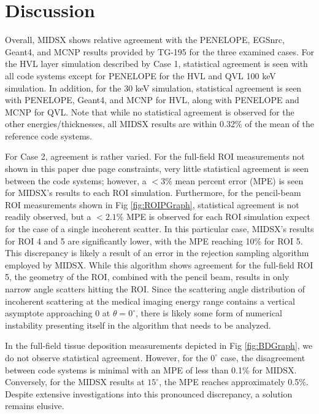 \newpage
\section{Discussion}
\par Overall, MIDSX shows relative agreement with the PENELOPE, EGSnrc, Geant4, and MCNP results provided by TG-195 for the three examined cases. For the HVL layer simulation described by Case 1, statistical agreement is seen with all code systems except for PENELOPE for the HVL and QVL 100 keV simulation. In addition, for the 30 keV simulation, statistical agreement is seen with PENELOPE, Geant4, and MCNP for HVL, along with PENELOPE and MCNP for QVL. Note that while no statistical agreement is observed for the other energies/thicknesses, all MIDSX results are within 0.32\% of the mean of the reference code systems.

\par For Case 2, agreement is rather varied. For the full-field ROI measurements not shown in this paper due page constraints, very little statistical agreement is seen between the code systems; however, a $<3$\% mean percent error (MPE) is seen for MIDSX's results to each ROI simulation. Furthermore, for the pencil-beam ROI measurements shown in Fig \ref{fig:ROIPGraph}, statistical agreement is not readily observed, but a $<2.1$\% MPE is observed for each ROI simulation expect for the case of a single incoherent scatter. In this particular case, MIDSX's results for ROI 4 and 5 are significantly lower, with the MPE reaching 10\% for ROI 5. This discrepancy is likely a result of an error in the rejection sampling algorithm employed by MIDSX. While this algorithm shows agreement for the full-field ROI 5, the geometry of the ROI, combined with the pencil beam, results in only narrow angle scatters hitting the ROI. Since the scattering angle distribution of incoherent scattering at the medical imaging energy range contains a vertical asymptote approaching 0 at $\theta = 0^\circ$, there is likely some form of numerical instability presenting itself in the algorithm that needs to be analyzed.

\par In the full-field tissue deposition measurements depicted in Fig \ref{fig:BDGraph}, we do not observe statistical agreement. However, for the $0^\circ$ case, the disagreement between code systems is minimal with an MPE of less than 0.1\% for MIDSX. Conversely, for the MIDSX results at $15^\circ$, the MPE reaches approximately 0.5\%. Despite extensive investigations into this pronounced discrepancy, a solution remains elusive.


